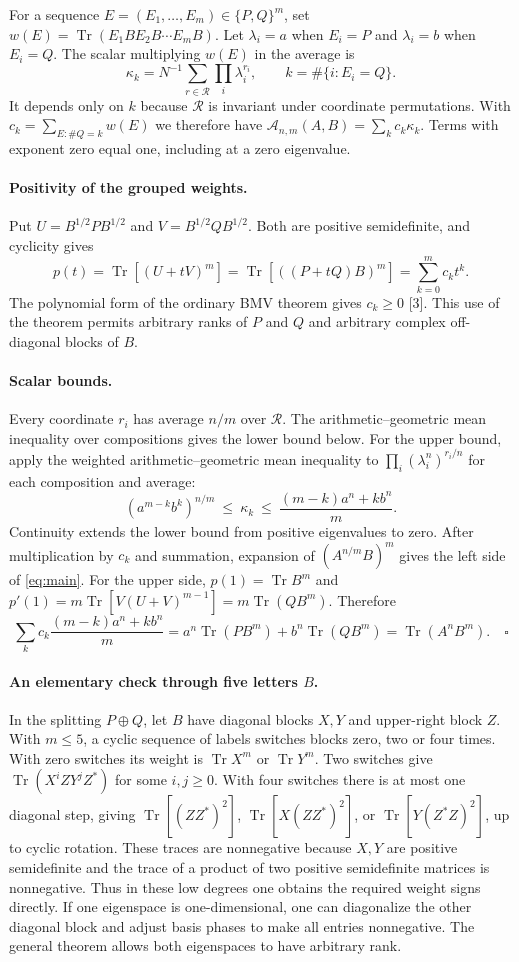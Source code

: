 \documentclass[11pt]{article}
\newcommand{\tr}{\operatorname{Tr}}
\newcommand{\av}{\mathcal A_{n,m}}
\begin{document}
For a sequence $E=(E_1,\ldots,E_m)\in\{P,Q\}^m$, set
$w(E)=\tr(E_1 B E_2 B\cdots E_m B)$. Let
$\lambda_i=a$ when $E_i=P$ and $\lambda_i=b$ when $E_i=Q$.
The scalar multiplying $w(E)$ in the average is
\[
 \kappa_k=N^{-1}\sum_{r\in\mathcal R}\prod_i\lambda_i^{r_i},
 \qquad k=\#\{i:E_i=Q\}.
\]
It depends only on $k$ because $\mathcal R$ is invariant under coordinate
permutations. With $c_k=\sum_{E:\#Q=k}w(E)$ we therefore have
$\av(A,B)=\sum_k c_k\kappa_k$. Terms with exponent zero equal one,
including at a zero eigenvalue.

\paragraph{Positivity of the grouped weights.}
Put $U=B^{1/2}PB^{1/2}$ and $V=B^{1/2}QB^{1/2}$. Both are positive
semidefinite, and cyclicity gives
\[
 p(t)=\tr[(U+tV)^m]=\tr[((P+tQ)B)^m]=\sum_{k=0}^m c_k t^k.
\]
The polynomial form of the ordinary BMV theorem gives $c_k\ge0$ [3].
This use of the theorem permits arbitrary ranks of $P$ and $Q$ and arbitrary
complex off-diagonal blocks of $B$.

\paragraph{Scalar bounds.}
Every coordinate $r_i$ has average $n/m$ over $\mathcal R$. The
arithmetic--geometric mean inequality over compositions gives the lower
bound below. For the upper bound, apply the weighted arithmetic--geometric
mean inequality to $\prod_i(\lambda_i^n)^{r_i/n}$ for each composition
and average:
\[
 (a^{m-k}b^k)^{n/m}\ \le\ \kappa_k\
 \le\ \frac{(m-k)a^n+kb^n}{m}.
\]
Continuity extends the lower bound from positive eigenvalues to zero.
After multiplication by $c_k$ and summation, expansion of
$(A^{n/m}B)^m$ gives the left side of \eqref{eq:main}. For the upper
side, $p(1)=\tr B^m$ and
$p'(1)=m\tr[V(U+V)^{m-1}]=m\tr(QB^m)$. Therefore
\[
 \sum_k c_k\frac{(m-k)a^n+kb^n}{m}
 =a^n\tr(PB^m)+b^n\tr(QB^m)=\tr(A^nB^m).\quad\square
\]

\paragraph{An elementary check through five letters $B$.}
In the splitting $P\oplus Q$, let $B$ have diagonal blocks $X,Y$ and
upper-right block $Z$. With $m\le5$, a cyclic sequence of labels switches
blocks zero, two or four times. With zero switches its weight is $\tr X^m$
or $\tr Y^m$. Two switches give $\tr(X^i ZY^j Z^*)$ for some
$i,j\ge0$. With four switches there is at most one diagonal step, giving
$\tr[(ZZ^*)^2]$, $\tr[X(ZZ^*)^2]$, or $\tr[Y(Z^*Z)^2]$, up to cyclic
rotation. These traces are nonnegative because $X,Y$ are positive
semidefinite and the trace of a product of two positive semidefinite
matrices is nonnegative. Thus in these low degrees one obtains the required
weight signs directly. If one eigenspace is one-dimensional, one can diagonalize the other
diagonal block and adjust basis phases to make all entries nonnegative.
The general theorem allows both eigenspaces to have arbitrary rank.
\end{document}
